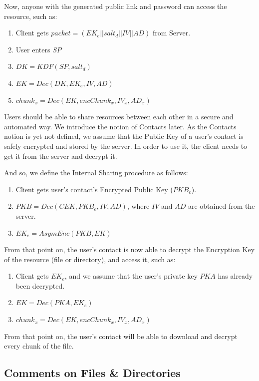 \documentclass[a4paper,9pt,twoside]{article}
\begin{document}
    Now, anyone with the generated public link and password can access the resource, such as:

\begin{enumerate}
\itemsep0em
\item Client gets $packet=(EK_e || salt_d || IV || AD)$ from Server.
\item User enters $SP$
\item $DK=KDF(SP, salt_d)$
\item $EK=Dec(DK, EK_e, IV, AD)$
\item $chunk_x=Dec(EK, encChunk_x, IV_x, AD_x)$
\end{enumerate}


Users should be able to share resources between each other in a secure and automated 
way. We introduce the notion of Contacts later. As the Contacts notion is yet not defined, 
we assume that the Public Key of a user's contact 
is safely encrypted and stored by the server. In order to use it, the client needs to get it from 
the server and decrypt it.

    And so, we define the Internal Sharing procedure as follows:

\begin{enumerate}
\itemsep0em
\item Client gets user's contact's Encrypted Public Key ($PKB_e$).
\item $PKB=Dec(CEK, PKB_e, IV, AD)$, where $IV$ and $AD$ are obtained from the server.
\item $EK_e=AsymEnc(PKB, EK)$
\end{enumerate}

    From that point on, the user's contact is now able to decrypt the Encryption Key of the 
resource (file or directory), and access it, such as:

\begin{enumerate}
\itemsep0em
\item Client gets $EK_e$, and we assume that the user's private key $PKA$ has already been decrypted.
\item $EK=Dec(PKA, EK_e)$
\item $chunk_x=Dec(EK, encChunk_x, IV_x, AD_x)$
\end{enumerate}

From that point on, the user's contact will be able to download and decrypt every chunk of the file.

\subsection{Comments on Files \& Directories}
\end{document}
